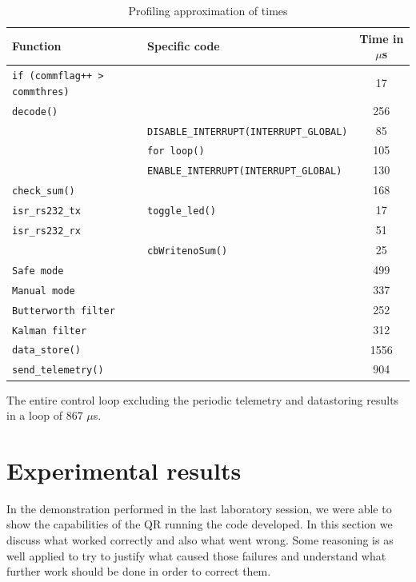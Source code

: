 \documentclass{article}
\begin{document}
\begin{table}[ht]
\centering
\begin{tabular}{|l|l|c|}
\hline 
\textbf{Function} & \textbf{Specific code} & \textbf{Time in $\mu$s} \\ 
\hline 
\texttt{if (commflag++ > commthres)} & & 17 \\
\hline
\texttt{decode()} & & 256 \\
\hline
 & \texttt{DISABLE\_INTERRUPT(INTERRUPT\_GLOBAL)} & 85 \\
 & \texttt{for loop()} & 105 \\
 & \texttt{ENABLE\_INTERRUPT(INTERRUPT\_GLOBAL)} & 130 \\
\hline
\texttt{check\_sum()} & & 168 \\
\hline
\texttt{isr\_rs232\_tx} & \texttt{toggle\_led()} & 17 \\
\hline
\texttt{isr\_rs232\_rx} & & 51 \\
\hline
 & \texttt{cbWritenoSum()} & 25 \\
\hline
\texttt{Safe mode} & & 499 \\
\hline
\texttt{Manual mode} & & 337 \\
\hline 
\texttt{Butterworth filter} & & 252 \\
\hline
\texttt{Kalman filter} & & 312 \\
\hline
\texttt{data\_store()} & & 1556 \\
\hline
\texttt{send\_telemetry()} & & 904 \\
\hline
\end{tabular} 
\caption{Profiling approximation of times}
\label{tbl:profiling}
\end{table}

The entire control loop excluding the periodic telemetry and datastoring results in a loop of 867 $\mu$s. 


\section{Experimental results}
\label{sec:results}
In the demonstration performed in the last laboratory session, we were able to show the capabilities of the QR running the code developed. In this section we discuss what worked correctly and also what went wrong. Some reasoning is as well applied to try to justify what caused those failures and understand what further work should be done in order to correct them.
\end{document}
